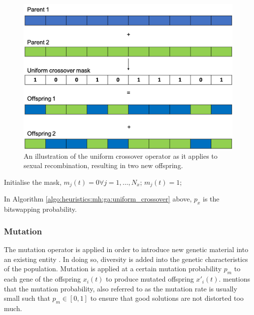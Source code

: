 \begin{figure}[htbp]
    \includegraphics[width=\textwidth]{images/uniform_crossover.png}
    \caption{An illustration of the uniform crossover operator as it applies to sexual recombination, resulting in two new offspring.}
    \label{fig:heuristics:mh:ga:uniform_crossover}
\end{figure}


\begin{algorithm}[H]
    \caption{The pseudo code for the uniform crossover operator as used by \acp{GA}.}
    \label{algo:heuristics:mh:ga:uniform_crossover}
    \begin{algorithmic}
        \State Initialise the mask, $m_{j}(t) = 0 \forall j = 1, \dots, N_{x}$;
                \State $m_{j}(t) = 1$;
            \EndIf
        \EndFor
        \State
    \end{algorithmic}
\end{algorithm}

In Algorithm \ref{algo:heuristics:mh:ga:uniform_crossover} above, $p_{x}$ is the bitswapping probability.


\subsubsection{Mutation}
\label{sec:heuristics:mh:ga:mutation}

The mutation operator is applied in order to introduce new genetic material into an existing entity \cite{ref:engelbrecht:2007}. In doing so, diversity is added into the genetic characteristics of the population. Mutation is applied at a certain mutation probability $p_{m}$ to each gene of the offspring $x_{i}(t)$ to produce mutated offspring $x'_{i}(t)$. \citeauthor{ref:engelbrecht:2007}\cite{ref:engelbrecht:2007} mentions that the mutation probability, also referred to as the mutation rate is usually small such that $p_{m} \in [0,1]$ to ensure that good solutions are not distorted too much.

